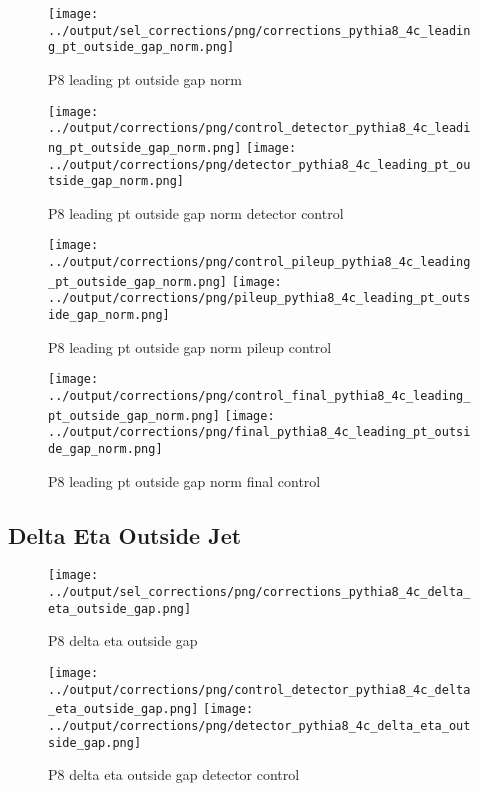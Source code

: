 \documentclass[11pt]{book}
\begin{document}
\begin{figure}[ht]
\centering
\texttt{[image: ../output/sel\_corrections/png/corrections\_pythia8\_4c\_leading\_pt\_outside\_gap\_norm.png]}
\caption{P8 leading pt outside gap norm}
\label{fig:p8_leading_pt_outside_gap_norm}
\end{figure}


\begin{figure}[ht]
\centering
\texttt{[image: ../output/corrections/png/control\_detector\_pythia8\_4c\_leading\_pt\_outside\_gap\_norm.png]}
\texttt{[image: ../output/corrections/png/detector\_pythia8\_4c\_leading\_pt\_outside\_gap\_norm.png]}
\caption{P8 leading pt outside gap norm detector control}
\label{fig:p8_leading_pt_outside_gap_norm_detector_control}
\end{figure}

\begin{figure}[ht]
\centering
\texttt{[image: ../output/corrections/png/control\_pileup\_pythia8\_4c\_leading\_pt\_outside\_gap\_norm.png]}
\texttt{[image: ../output/corrections/png/pileup\_pythia8\_4c\_leading\_pt\_outside\_gap\_norm.png]}
\caption{P8 leading pt outside gap norm pileup control}
\label{fig:p8_leading_pt_outside_gap_norm_pileup_control}
\end{figure}


\begin{figure}[ht]
\centering
\texttt{[image: ../output/corrections/png/control\_final\_pythia8\_4c\_leading\_pt\_outside\_gap\_norm.png]}
\texttt{[image: ../output/corrections/png/final\_pythia8\_4c\_leading\_pt\_outside\_gap\_norm.png]}
\caption{P8 leading pt outside gap norm final control}
\label{fig:p8_leading_pt_outside_gap_norm_final_control}
\end{figure}


\clearpage
\subsection{Delta Eta Outside Jet}
\begin{figure}[ht]
\centering
\texttt{[image: ../output/sel\_corrections/png/corrections\_pythia8\_4c\_delta\_eta\_outside\_gap.png]}
\caption{P8 delta eta outside gap}
\label{fig:p8_delta_eta_outside_gap}
\end{figure}


\begin{figure}[ht]
\centering
\texttt{[image: ../output/corrections/png/control\_detector\_pythia8\_4c\_delta\_eta\_outside\_gap.png]}
\texttt{[image: ../output/corrections/png/detector\_pythia8\_4c\_delta\_eta\_outside\_gap.png]}
\caption{P8 delta eta outside gap detector control}
\label{fig:p8_delta_eta_outside_gap_detector_control}
\end{figure}
\end{document}
